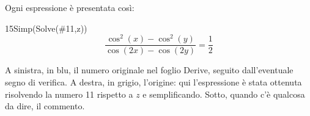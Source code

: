 Ogni espressione \`e presentata cos\`i:

\begin{espr}{15}{Simp(Solve(\#11,z))}{\verificata}
\[
  \frac{\cos^{2}(x)-\cos^{2}(y)}{\cos(2x)-\cos(2y)} = \frac{1}{2}
\]
\end{espr}

\noindent
A sinistra, in blu, il numero originale nel foglio Derive, seguito
dall'eventuale segno di verifica. A destra, in grigio, l'origine: qui
l'espressione \`e stata ottenuta risolvendo la numero 11 rispetto a $z$ e
semplificando. Sotto, quando c'\`e qualcosa da dire, il commento.
